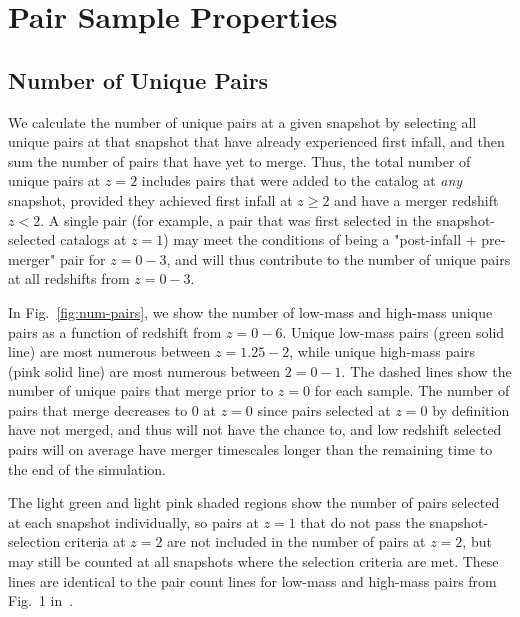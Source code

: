 \documentclass[twocolumn]{aastex631}
\begin{document}


\section{Pair Sample Properties}
\subsection{Number of Unique Pairs}
We calculate the number of unique pairs at a given snapshot by selecting all unique pairs at that snapshot that have already experienced first infall, and then sum the number of pairs that have yet to merge.
Thus, the total number of unique pairs at $z=2$ includes pairs that were added to the catalog at \textit{any} snapshot, provided they achieved first infall at $z\geq2$ and have a merger redshift $z<2$. 
A single pair (for example, a pair that was first selected in the snapshot-selected catalogs at $z=1$) may meet the conditions of being a "post-infall + pre-merger" pair for $z=0-3$, and will thus contribute to the number of unique pairs at all redshifts from $z=0-3$. 

In Fig.~\ref{fig:num-pairs}, we show the number of low-mass and high-mass unique pairs as a function of redshift from $z=0-6$. 
Unique low-mass pairs (green solid line) are most numerous between $z=1.25-2$, while unique high-mass pairs (pink solid line) are most numerous between $2=0-1$.
The dashed lines show the number of unique pairs that merge prior to $z=0$ for each sample. 
The number of pairs that merge decreases to 0 at $z=0$ since pairs selected at $z=0$ by definition have not merged, and thus will not have the chance to, and low redshift selected pairs will on average have merger timescales longer than the remaining time to the end of the simulation. 

The light green and light pink shaded regions show the number of pairs selected at each snapshot individually, so pairs at $z=1$ that do not pass the snapshot-selection criteria at $z=2$ are not included in the number of pairs at $z=2$, but may still be counted at all snapshots where the selection criteria are met. 
These lines are identical to the pair count lines for low-mass and high-mass pairs from Fig.~1 in~\cite{Chamberlain2024}.
\end{document}
